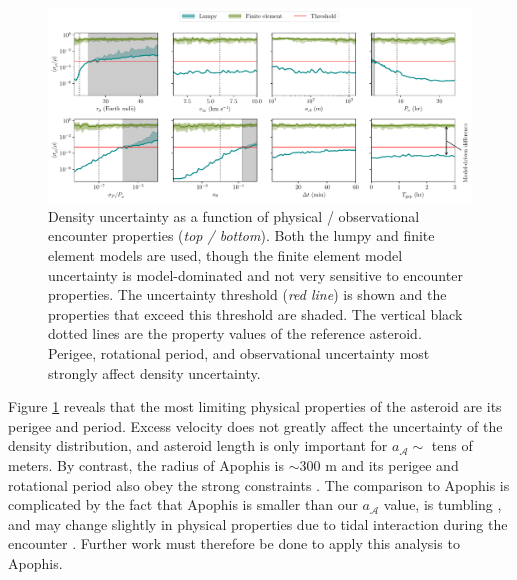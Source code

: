 \documentclass[fleqn,usenatbib]{mnras}
\begin{document}
\begin{figure}
  \centering
  \includegraphics[width=\linewidth]{figs/unc-scan.pdf}
  \caption{Density uncertainty as a function of physical / observational encounter properties (\textit{top / bottom}). Both the lumpy and finite element models are used, though the finite element model uncertainty is model-dominated and not very sensitive to encounter properties. The uncertainty threshold (\textit{red line}) is shown and the properties that exceed this threshold are shaded. The vertical black dotted lines are the property values of the reference asteroid. Perigee, rotational period, and observational uncertainty most strongly affect density uncertainty.}
  \label{fig:net-uncertainty}
\end{figure}

Figure \ref{fig:net-uncertainty} reveals that the most limiting physical properties of the asteroid are its perigee and period. Excess velocity does not greatly affect the uncertainty of the density distribution, and asteroid length is only important for $a_\mathcal{A}\sim$ tens of meters. By contrast, the radius of Apophis is  $\sim 300$ m and its perigee and rotational period also obey the strong constraints \citep{giorgini2008predicting}. The comparison to Apophis is complicated by the fact that Apophis is smaller than our $a_\mathcal{A}$ value, is tumbling \citep{PRAVEC201448}, and may change slightly in physical properties due to tidal interaction during the encounter \citep{yu2014numerical,hirabayashi2021finite}. Further work must therefore be done to apply this analysis to Apophis.
\end{document}
